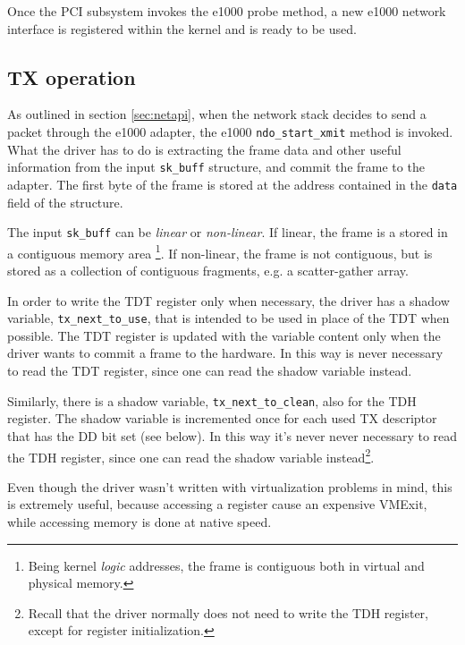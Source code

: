 Once the PCI subsystem invokes the e1000 probe method, a new e1000 network interface is registered within the kernel and is ready to be
used.


\subsection{TX operation}
\label{sec:txdriver}
As outlined in section \ref{sec:netapi}, when the network stack decides to send a packet through the e1000 adapter, the e1000
\texttt{ndo\_start\_xmit} method is invoked. What the driver has to do is extracting the frame data and other useful information from the 
input \texttt{sk\_buff} structure, and commit the frame to the adapter. The first byte of the frame is stored at the address contained
in the \texttt{data} field of the structure.

The input \texttt{sk\_buff} can be \emph{linear} or \emph{non-linear}. If linear, the frame is a stored in a contiguous memory area
\footnote{Being kernel \emph{logic} addresses, the frame is contiguous both in virtual and physical memory.}.
If non-linear, the frame is not contiguous, but is stored as a collection of contiguous fragments, e.g. a scatter-gather array.

\vspace{0.5cm}

In order to write the TDT register only when necessary, the driver has a shadow variable, \texttt{tx\_next\_to\_use}, that is intended to
be used in place of the TDT when possible. The TDT register is updated with the variable content only when the driver wants to commit a 
frame to the hardware. In this way is never necessary to read the TDT register, since one can read the shadow variable instead.

Similarly, there is a shadow variable, \texttt{tx\_next\_to\_clean}, also for the TDH register. The shadow variable is incremented
once for each used TX descriptor that has the DD bit set (see below). In this way it's never never necessary
to read the TDH register, since one can read the shadow variable instead\footnote{Recall that
the driver normally does not need to write the TDH register, except for register initialization.}.

Even though the driver wasn't written with virtualization problems in mind, this is extremely useful, because accessing a register cause
an expensive VMExit, while accessing memory is done at native speed.

\vspace{0.5cm}

